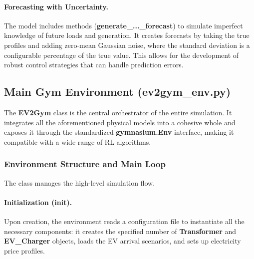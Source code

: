 \paragraph{Forecasting with Uncertainty.} The model includes methods (\textbf{generate\_...\_forecast}) to simulate imperfect knowledge of future loads and generation. It creates forecasts by taking the true profiles and adding zero-mean Gaussian noise, where the standard deviation is a configurable percentage of the true value. This allows for the development of robust control strategies that can handle prediction errors.

\subsection{Main Gym Environment (\textbf{ev2gym\_env.py})}
The \textbf{EV2Gym} class is the central orchestrator of the entire simulation. It integrates all the aforementioned physical models into a cohesive whole and exposes it through the standardized \textbf{gymnasium.Env} interface, making it compatible with a wide range of RL algorithms.

\subsubsection{Environment Structure and Main Loop}
The class manages the high-level simulation flow.
\noindent
\paragraph{Initialization (\textbf{init}).} Upon creation, the environment reads a configuration file to instantiate all the necessary components: it creates the specified number of \textbf{Transformer} and \textbf{EV\_Charger} objects, loads the EV arrival scenarios, and sets up electricity price profiles.
\noindent
